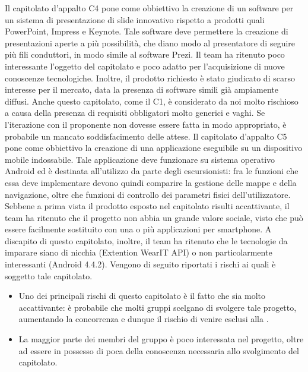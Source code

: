 			Il capitolato d'appalto C4 pone come obbiettivo la creazione di un software per un sistema di presentazione di slide innovativo rispetto a prodotti quali PowerPoint, Impress e Keynote. Tale software deve permettere la creazione di presentazioni aperte a più possibilità, che diano modo al presentatore di seguire più fili conduttori, in modo simile al software Prezi.
			Il team ha ritenuto poco interessante l'oggetto del capitolato e poco adatto per l'acquisizione di nuove conoscenze tecnologiche. Inoltre, il prodotto richiesto è stato giudicato di scarso interesse per il mercato, data la presenza di software simili già ampiamente diffusi.
			Anche questo capitolato, come il C1, è considerato da noi molto rischioso a causa della presenza di requisiti obbligatori molto generici e vaghi. Se l'iterazione con il proponente non dovesse essere fatta in modo appropriato, è probabile un mancato soddisfacimento delle attese.
			Il capitolato d'appalto C5 pone come obbiettivo la creazione di una applicazione eseguibile su un dispositivo mobile indossabile. Tale applicazione deve funzionare su sistema operativo Android ed è destinata all'utilizzo da parte degli escursionisti: fra le funzioni che essa deve implementare devono quindi comparire la gestione delle mappe e della navigazione, oltre che funzioni di controllo dei parametri fisici dell'utilizzatore.
		Sebbene a prima vista il prodotto esposto nel capitolato risulti accattivante, il team ha ritenuto che il progetto non abbia un grande valore sociale, visto che può essere facilmente sostituito con una o più applicazioni per smartphone. A discapito di questo capitolato, inoltre, il team ha ritenuto che le tecnologie da imparare siano di nicchia (Extention WearIT API) o non particolarmente interessanti (Android 4.4.2).
			Vengono di seguito riportati i rischi ai quali è soggetto tale capitolato.
			\begin{itemize}
				\item Uno dei principali rischi di questo capitolato è il fatto che sia molto accattivante: è probabile che molti gruppi scelgano di svolgere tale progetto, aumentando la concorrenza e dunque il rischio di venire esclusi alla .
				\item La maggior parte dei membri del gruppo è poco interessata nel progetto, oltre ad essere in possesso di poca della conoscenza necessaria allo svolgimento del capitolato.
			\end{itemize}
